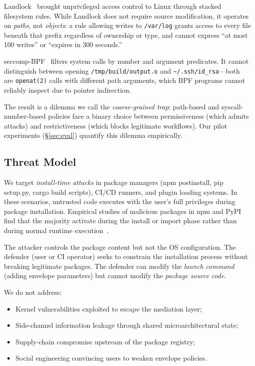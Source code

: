\documentclass[letterpaper,twocolumn,10pt]{article}
\begin{document}
Landlock~\cite{landlock2023} brought unprivileged access control to
Linux through stacked filesystem rules.  While Landlock does not
require source modification, it operates on \emph{paths}, not
\emph{objects}: a rule allowing writes to \texttt{/var/log} grants
access to every file beneath that prefix regardless of ownership or
type, and cannot express ``at most 100 writes'' or ``expires in 300
seconds.''

seccomp-BPF~\cite{seccomp2012} filters system calls by number and
argument predicates.  It cannot distinguish between opening
\texttt{/tmp/build/output.o} and \texttt{\~{}/.ssh/id\_rsa}---both are
\texttt{openat(2)} calls with different path arguments, which BPF
programs cannot reliably inspect due to pointer indirection.

The result is a dilemma we call the \emph{coarse-grained trap}: 
path-based and syscall-number-based policies face a binary choice
between permissiveness (which admits attacks) and restrictiveness
(which blocks legitimate workflows).  Our pilot experiments
(\S\ref{sec:eval}) quantify this dilemma empirically.

\subsection{Threat Model}

We target \emph{install-time attacks} in package managers (npm
postinstall, pip setup.py, cargo build scripts), CI/CD runners, and
plugin loading systems.  In these scenarios, untrusted code executes
with the user's full privileges during package installation.  Empirical
studies of malicious packages in npm and PyPI find that the majority
activate during the install or import phase rather than during normal
runtime execution~\cite{duan2021measuring,ohm2020backstabber,ladisa2023taxonomy}.

The attacker controls the package content but not the OS configuration.
The defender (user or CI operator) seeks to constrain the installation
process without breaking legitimate packages.  The defender can modify
the \emph{launch command} (adding envelope parameters) but cannot
modify the \emph{package source code}.

We do not address:
\begin{itemize}
\item Kernel vulnerabilities exploited to escape the mediation layer;
\item Side-channel information leakage through shared microarchitectural state;
\item Supply-chain compromise upstream of the package registry;
\item Social engineering convincing users to weaken envelope policies.
\end{itemize}
\end{document}
